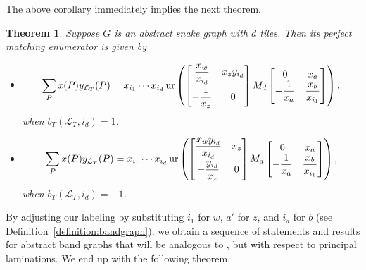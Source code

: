 \documentclass[pdftex]{sigma}
\numberwithin{equation}{section}
\newtheorem{Theorem}{Theorem}[section]
\theoremstyle{definition}
\begin{document}
The above corollary immediately implies the next theorem.

\begin{Theorem}\label{theorem:perfectmatchingenum}
 Suppose $G$ is an abstract snake graph with $d$ tiles. Then its perfect matching enumerator is given by
 \begin{itemize}\itemsep=0pt
 \item \[
 \sum_P x(P)y_{\mathcal{L}_T}(P)=x_{i_1}\cdots x_{i_d} \operatorname{ur}\left(\begin{bmatrix}
\dfrac{x_w}{x_{i_d}} & x_{z}y_{i_d}\vspace{1mm}\\
-\dfrac{1}{x_{z}} & 0
\end{bmatrix}
M_d
\begin{bmatrix}
0 & x_a\\
-\dfrac{1}{x_a} & \dfrac{x_b}{x_{i_1}}
\end{bmatrix}\right),\] when $ b_{T}(\mathcal{L}_{T}, i_{d})=1$.

\item \[
\sum_P x(P)y_{\mathcal{L}_T}(P)=x_{i_1}\cdots x_{i_d} \operatorname{ur}\left(\begin{bmatrix}
\dfrac{x_w y_{i_d}}{x_{i_d}} & x_{z}\vspace{1mm}\\
-\dfrac{y_{i_d}}{x_{z}} & 0
\end{bmatrix}
M_d
\begin{bmatrix}
0 & x_a\\
-\dfrac{1}{x_a} & \dfrac{x_b}{x_{i_1}}
\end{bmatrix}\right),\] when $b_{T}(\mathcal{L}_{T}, i_{d})=-1$.
\end{itemize}
\end{Theorem}

By adjusting our labeling by substituting $i_1$ for $w$, $a'$ for $z$, and $i_d$ for $b$ (see Definition~\ref{definition:bandgraph}), we obtain a sequence of statements and results for abstract band graphs that will be analogous to \cite[Proposition 5.7 and Corollary 5.8]{MW13}, but with respect to principal laminations. We end up with the following theorem.
\end{document}
